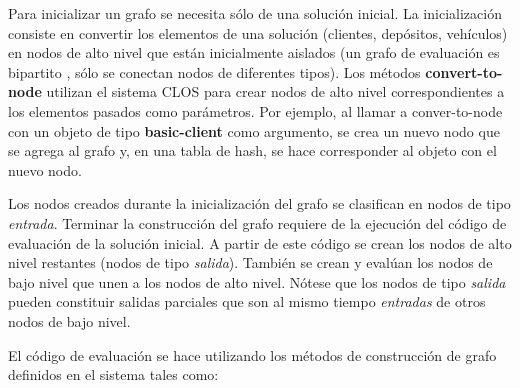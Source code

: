 Para inicializar un grafo se necesita sólo de una solución inicial. La inicialización consiste en convertir los elementos de una solución (clientes, depósitos, vehículos) en nodos de alto nivel que están inicialmente aislados (un grafo de evaluación es bipartito \cite{Hector}, sólo se conectan nodos de diferentes tipos). Los métodos \textbf{convert-to-node} utilizan el sistema CLOS para crear nodos de alto nivel correspondientes a los elementos pasados como parámetros. Por ejemplo, al llamar a conver-to-node con un objeto de tipo \textbf{basic-client} como argumento, se crea un nuevo nodo que se agrega al grafo y, en una tabla de hash, se hace corresponder al objeto con el nuevo nodo.

Los nodos creados durante la inicialización del grafo se clasifican en nodos de tipo \textit{entrada}. Terminar la construcción del grafo requiere de la ejecución del código de evaluación de la solución inicial. A partir de este código se crean los nodos de alto nivel restantes (nodos de tipo \textit{salida}). También se crean y evalúan los nodos de bajo nivel que unen a los nodos de alto nivel. Nótese que los nodos de tipo \textit{salida} pueden constituir salidas parciales que son al mismo tiempo \textit{entradas} de otros nodos de bajo nivel.


El código de evaluación se hace utilizando los métodos de construcción de grafo definidos en el sistema tales como:

